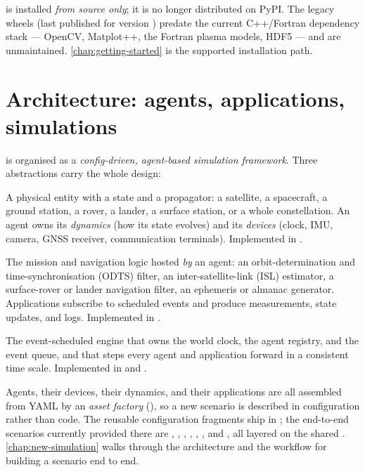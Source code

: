 \begin{lupntnote}
\lupnt{} is installed \emph{from source only}; it is no longer distributed on
PyPI. The legacy \pylupnt{} wheels (last published for version )
predate the current C++/Fortran dependency stack --- OpenCV, Matplot++, the
Fortran plasma models, HDF5 --- and are unmaintained. \cref{chap:getting-started}
is the supported installation path.
\end{lupntnote}

\section{Architecture: agents, applications, simulations}
\label{sec:intro-architecture}

\lupnt{} is organised as a \emph{config-driven, agent-based simulation
framework}. Three abstractions carry the whole design:

\begin{description}[leftmargin=1.2cm,style=nextline,font=\normalfont\itshape]
  \item[Agent] A physical entity with a state and a propagator: a satellite, a
    spacecraft, a ground station, a rover, a lander, a surface station, or a
    whole constellation. An agent owns its \emph{dynamics} (how its state
    evolves) and its \emph{devices} (clock, IMU, camera, GNSS receiver,
    communication terminals). Implemented in .
  \item[Application] The mission and navigation logic hosted \emph{by} an
    agent: an orbit-determination and time-synchronisation (ODTS) filter, an
    inter-satellite-link (ISL) estimator, a surface-rover or lander navigation
    filter, an ephemeris or almanac generator. Applications subscribe to
    scheduled events and produce measurements, state updates, and logs.
    Implemented in .
  \item[Simulation] The event-scheduled engine that owns the world clock, the
    agent registry, and the event queue, and that steps every agent and
    application forward in a consistent time scale. Implemented in
     and
    .
\end{description}

Agents, their devices, their dynamics, and their applications are all
assembled from YAML by an \emph{asset factory}
(), so a new scenario is described in
configuration rather than code. The reusable configuration fragments ship in
; the end-to-end scenarios currently provided there are
, ,
, ,
, , and
, all layered on the shared
. \cref{chap:new-simulation} walks through the
architecture and the workflow for building a scenario end to end.

